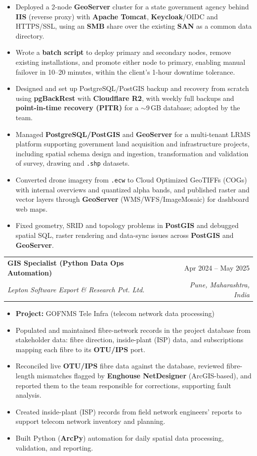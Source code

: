 \documentclass[letterpaper,11pt]{article}
\makeatletter
\newcommand{\resumeItem}[1]{
  \item\small{
    {#1 \vspace{-2pt}}
  }
}
\newcommand{\resumeSubheading}[4]{
  \vspace{-2pt}\item
    \begin{tabular*}{0.97\textwidth}[t]{l@{\extracolsep{\fill}}r}
      \textbf{#1} & #2 \\
      \textit{\small#3} & \textit{\small #4} \\
    \end{tabular*}\vspace{-7pt}
}
\newcommand{\resumeItemListStart}{\begin{itemize}}
\newcommand{\resumeItemListEnd}{\end{itemize}\vspace{-5pt}}
\makeatother
\begin{document}
\resumeItemListStart
\resumeItem{Deployed a 2-node \textbf{GeoServer} cluster for a state government agency behind \textbf{IIS} (reverse proxy) with \textbf{Apache Tomcat}, \textbf{Keycloak}/OIDC and HTTPS/SSL, using an \textbf{SMB} share over the existing \textbf{SAN} as a common data directory.}
\resumeItem{Wrote a \textbf{batch script} to deploy primary and secondary nodes, remove existing installations, and promote either node to primary, enabling manual failover in 10--20 minutes, within the client's 1-hour downtime tolerance.}
\resumeItem{Designed and set up PostgreSQL/PostGIS backup and recovery from scratch using \textbf{pgBackRest} with \textbf{Cloudflare R2}, with weekly full backups and \textbf{point-in-time recovery (PITR)} for a $\sim$9\,GB database; adopted by the team.}
\resumeItem{Managed \textbf{PostgreSQL/PostGIS} and \textbf{GeoServer} for a multi-tenant LRMS platform supporting government land acquisition and infrastructure projects, including spatial schema design and ingestion, transformation and validation of survey, drawing and \texttt{.shp} datasets.}
\resumeItem{Converted drone imagery from \texttt{.ecw} to Cloud Optimized GeoTIFFs (COGs) with internal overviews and quantized alpha bands, and published raster and vector layers through \textbf{GeoServer} (WMS/WFS/ImageMosaic) for dashboard web maps.}
\resumeItem{Fixed geometry, SRID and topology problems in \textbf{PostGIS} and debugged spatial SQL, raster rendering and data-sync issues across \textbf{PostGIS} and \textbf{GeoServer}.}
\resumeItemListEnd
      
      
      \resumeSubheading
  {GIS Specialist (Python Data Ops Automation)}{Apr 2024 -- May 2025}
  {Lepton Software Export \& Research Pvt. Ltd.}{Pune, Maharashtra, India}

\resumeItemListStart
  \resumeItem{\textbf{Project:} GOFNMS Tele Infra (telecom network data processing)}
  \resumeItem{Populated and maintained fibre-network records in the project database from stakeholder data: fibre direction, inside-plant (ISP) data, and subscriptions mapping each fibre to its \textbf{OTU/IPS} port.}
  \resumeItem{Reconciled live \textbf{OTU/IPS} fibre data against the database, reviewed fibre-length mismatches flagged by \textbf{Enghouse NetDesigner} (ArcGIS-based), and reported them to the team responsible for corrections, supporting fault analysis.}
  \resumeItem{Created inside-plant (ISP) records from field network engineers' reports to support telecom network inventory and planning.}
  \resumeItem{Built Python (\textbf{ArcPy}) automation for daily spatial data processing, validation, and reporting.}
\resumeItemListEnd
\end{document}
